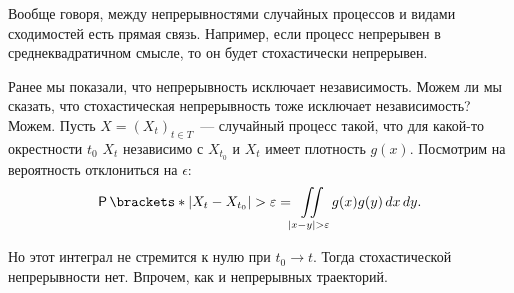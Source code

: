 Вообще говоря, между непрерывностями случайных процессов и видами сходимостей 
есть прямая связь. Например, если процесс непрерывен в среднеквадратичном 
смысле, то он будет стохастически непрерывен.

Ранее мы показали, что непрерывность исключает независимость. Можем ли мы 
сказать, что стохастическая непрерывность тоже исключает независимость? Можем. 
Пусть \(X = (X_{t})_{t \in T}\)~--- случайный процесс такой, что для 
какой-то окрестности \(t_{0}\) \(X_{t}\) независимо с \(X_{t_{0}}\) и \(X_{t}\) 
имеет плотность \(g(x)\). Посмотрим на вероятность отклониться на \(\epsilon\):
\[
\Pr{|X_{t} - X_{t_{0}}| > \epsilon} = \iint\limits_{|x - y| > \epsilon} 
g(x)g(y)\diff x \diff y.
\]

Но этот интеграл не стремится к нулю при \(t_{0} \to t\). Тогда стохастической 
непрерывности нет. Впрочем, как и непрерывных траекторий.